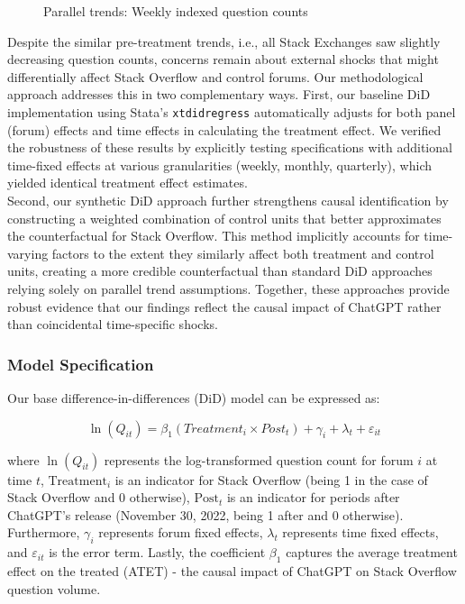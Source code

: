 \begin{figure}[H]
    \centering
    
    \caption{Parallel trends: Weekly indexed question counts}
    \label{fig:paralleL_trend_trans}
\end{figure}

Despite the similar pre-treatment trends, i.e., all Stack Exchanges saw slightly decreasing question counts, concerns remain about external shocks that might differentially affect Stack Overflow and control forums. Our methodological approach addresses this in two complementary ways. First, our baseline DiD implementation using Stata's \texttt{xtdidregress} automatically adjusts for both panel (forum) effects and time effects in calculating the treatment effect. We verified the robustness of these results by explicitly testing specifications with additional time-fixed effects at various granularities (weekly, monthly, quarterly), which yielded identical treatment effect estimates.\\

Second, our synthetic DiD approach further strengthens causal identification by constructing a weighted combination of control units that better approximates the counterfactual for Stack Overflow. This method implicitly accounts for time-varying factors to the extent they similarly affect both treatment and control units, creating a more credible counterfactual than standard DiD approaches relying solely on parallel trend assumptions. Together, these approaches provide robust evidence that our findings reflect the causal impact of ChatGPT rather than coincidental time-specific shocks.


\subsubsection{Model Specification}
Our base difference-in-differences (DiD) model can be expressed as:

\begin{equation}\label{eq:basedid}
\ln(Q_{it}) = \beta_1(Treatment_i \times Post_t) + \gamma_i + \lambda_t + \varepsilon_{it}
\end{equation}

where $\ln(Q_{it})$ represents the log-transformed question count for forum $i$ at time $t$, $\text{Treatment}_i$ is an indicator for Stack Overflow (being 1 in the case of Stack Overflow and 0 otherwise), $\text{Post}_t$ is an indicator for periods after ChatGPT's release (November 30, 2022, being 1 after and 0 otherwise).  Furthermore, $\gamma_i$ represents forum fixed effects, $\lambda_t$ represents time fixed effects, and $\varepsilon_{it}$ is the error term. Lastly, the coefficient $\beta_1$ captures the average treatment effect on the treated (ATET) - the causal impact of ChatGPT on Stack Overflow question volume.\\

